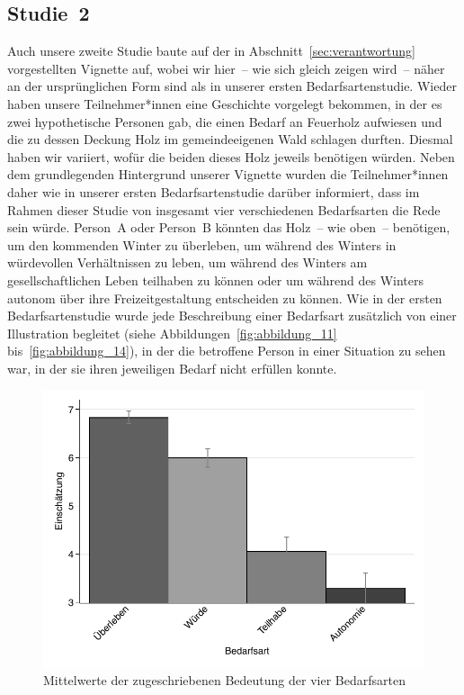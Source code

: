 \documentclass[justified,nobib,symmetric,twoside]{tufte-handout}
\begin{document}
\subsection{Studie~2}\label{sec:bedarfsarten_2}
Auch unsere zweite Studie baute auf der in Abschnitt~\ref{sec:verantwortung} vorgestellten Vignette auf, wobei wir hier~-- wie sich gleich zeigen wird~-- näher an der ursprünglichen Form sind als in unserer ersten Bedarfsartenstudie.
Wieder haben unsere Teilnehmer*innen eine Geschichte vorgelegt bekommen, in der es zwei hypothetische Personen gab, die einen Bedarf an Feuerholz aufwiesen und die zu dessen Deckung Holz im gemeindeeigenen Wald schlagen durften.
Diesmal haben wir variiert, wofür die beiden dieses Holz jeweils benötigen würden.
Neben dem grundlegenden Hintergrund unserer Vignette wurden die Teilnehmer*innen daher wie in unserer ersten Bedarfsartenstudie darüber informiert, dass im Rahmen dieser Studie von insgesamt vier verschiedenen Bedarfsarten die Rede sein würde.
Person~A oder Person~B könnten das Holz~-- wie oben~-- benötigen, um den kommenden Winter zu überleben, um während des Winters in würdevollen Verhältnissen zu leben, um während des Winters am gesellschaftlichen Leben teilhaben zu können oder um während des Winters autonom über ihre Freizeitgestaltung entscheiden zu können.
Wie in der ersten Bedarfsartenstudie wurde jede Beschreibung einer Bedarfsart zusätzlich von einer Illustration begleitet (siehe Abbildungen~\ref{fig:abbildung_11} bis~\ref{fig:abbildung_14}), in der die betroffene Person in einer Situation zu sehen war, in der sie ihren jeweiligen Bedarf nicht erfüllen konnte.

\begin{figure}[t]\label{fig:abbildung_15}
   \includegraphics[width=0.99\linewidth]{figure_15.pdf}
   \caption{Mittelwerte der zugeschriebenen Bedeutung der vier Bedarfsarten}
\end{figure}
\end{document}
